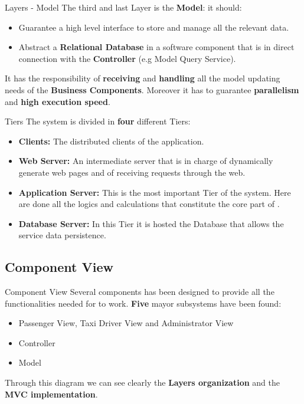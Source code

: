 \documentclass{../common/latex_classes/pdf_presentation}
\begin{document}
	\begin{frame}{Layers - Model}
		The third and last Layer is the \textbf{Model}: it should:
		\begin{itemize}
			\item Guarantee a high level interface to store and manage all the \myTaxiService{} relevant data. 
			\item Abstract a \textbf{Relational Database} in a software component that is in direct connection with the \textbf{Controller} (e.g Model Query Service).
		\end{itemize}
		
		It has the responsibility of \textbf{receiving} and \textbf{handling} all the model updating needs of the \textbf{Business Components}. 
		Moreover it has to guarantee \textbf{parallelism} and \textbf{high execution speed}.
	\end{frame}
	
	\begin{frame}{Tiers}
		The system is divided in \textbf{four} different Tiers:
		\begin{itemize}
			\item \textbf{Clients:} The distributed clients of the application.
			\item \textbf{Web Server:} An intermediate server that is in charge of dynamically generate web pages and of receiving requests through the web.
			\item \textbf{Application Server:} This is the most important Tier of the system. Here are done all the logics and calculations that constitute the core part of \myTaxiService{}.
			\item \textbf{Database Server:} In this Tier it is hosted the Database that allows the service data persistence.
		\end{itemize}
	\end{frame}
	
	\subsection{Component View}
	
	\begin{frame}{Component View}
		Several components has been designed to provide all the functionalities needed for \myTaxiService{} to work.
		\textbf{Five} mayor subsystems have been found:
		\begin{itemize}
			\item Passenger View, Taxi Driver View and Administrator View
			\item Controller
			\item Model
		\end{itemize}
		Through this diagram we can see clearly the \textbf{Layers organization} and the \textbf{MVC implementation}.
	\end{frame}
	
\end{document}
